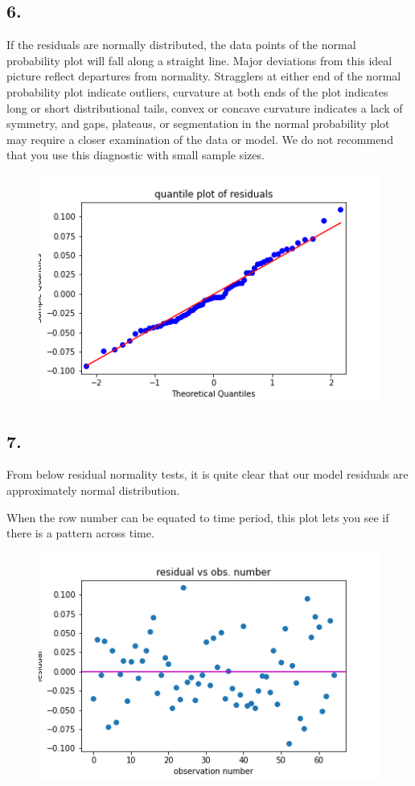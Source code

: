 \documentclass{article}
\begin{document}
\subsection*{6.}
If the residuals are normally distributed, the data points of the normal probability plot will fall along a straight
line. Major deviations from this ideal picture reflect departures from normality. Stragglers at either end of the
normal probability plot indicate outliers, curvature at both ends of the plot indicates long or short distributional
tails, convex or concave curvature indicates a lack of symmetry, and gaps, plateaus, or segmentation in the normal
probability plot may require a closer examination of the data or model. We do not recommend that you use this
diagnostic with small sample sizes.
\begin{figure}[H]
    \includegraphics[]{plots/q6-1.png}
\end{figure}
\subsection*{7.}
From below residual normality tests, it is quite clear that our model residuals are approximately normal distribution.

When the row number can be equated to time period, this plot lets you see if there is a pattern across time.
\begin{figure}[H]
    \includegraphics[]{plots/q6-2.png}
\end{figure}
\end{document}
